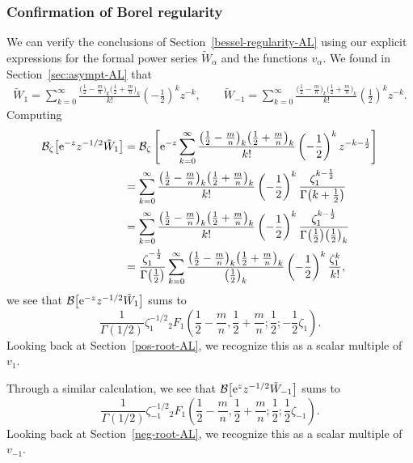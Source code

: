 \documentclass[pdftex]{sigma}
\newcommand{\borel}{\mathcal{B}}
\numberwithin{equation}{section}
\begin{document}
\subsubsection{Confirmation of Borel regularity}\label{confirmation-borel-regularity}
%
We can verify the conclusions of Section~\ref{bessel-regularity-AL} using our explicit expressions for the formal power series $\tilde{W}_\alpha$ and the functions $v_\alpha$. We found in Section~\ref{sec:asympt-AL} that
\begin{gather*}
\tilde{W}_1 = \sum_{k = 0}^{\infty} \frac{\bigl(\frac{1}{2}-\frac{m}{n}\bigr)_k \bigl(\frac{1}{2}+\frac{m}{n}\bigr)_k}{k!} \left(-\frac{1}{2}\right)^k z^{-k} ,\qquad
\tilde{W}_{-1} = \sum_{k = 0}^{\infty} \frac{\bigl(\frac{1}{2}-\frac{m}{n}\bigr)_k \bigl(\frac{1}{2}+\frac{m}{n}\bigr)_k}{k!} \left(\frac{1}{2}\right)^k z^{-k}.
\end{gather*}
Computing
\begin{align*}
\borel_\zeta \bigl[ {\rm e}^{-z} z^{-1/2} \tilde{W}_1 \bigr] & = \borel_\zeta \left[ {\rm e}^{-z} \sum_{k = 0}^{\infty} \frac{\bigl(\frac{1}{2}-\frac{m}{n}\bigr)_k \bigl(\frac{1}{2}+\frac{m}{n}\bigr)_k}{k!} \left(-\frac{1}{2}\right)^k z^{-k-\frac{1}{2}} \right] \\
& = \sum_{k = 0}^{\infty} \frac{\bigl(\frac{1}{2}-\frac{m}{n}\bigr)_k \bigl(\frac{1}{2}+\frac{m}{n}\bigr)_k}{k!} \left(-\frac{1}{2}\right)^k \frac{\zeta_1^{k-\frac{1}{2}}}{\Gamma\bigl(k+\frac{1}{2}\bigr)} \\
& = \sum_{k = 0}^{\infty} \frac{\bigl(\frac{1}{2}-\frac{m}{n}\bigr)_k \bigl(\frac{1}{2}+\frac{m}{n}\bigr)_k}{k!} \left(-\frac{1}{2}\right)^k \frac{\zeta_1^{k-\frac{1}{2}}}{\Gamma\bigl(\frac{1}{2}\bigr) \bigl(\frac{1}{2}\bigr)_k} \\
& = \frac{\zeta_1^{-\frac{1}{2}}}{\Gamma\bigl(\frac{1}{2}\bigr)} \sum_{k = 0}^{\infty} \frac{\bigl(\frac{1}{2}-\frac{m}{n}\bigr)_k \bigl(\frac{1}{2}+\frac{m}{n}\bigr)_k}{\bigl(\frac{1}{2}\bigr)_k} \left(-\frac{1}{2}\right)^k \frac{\zeta_1^k}{k!},
\end{align*}
we see that $\borel\bigl[ {\rm e}^{-z} z^{-1/2} \tilde{W}_1 \bigr]$ sums to
\[ \frac{1}{\Gamma(1/2)} \zeta_1^{-1/2} {}_2F_1\left(\frac{1}{2}-\frac{m}{n}, \frac{1}{2}+\frac{m}{n}; \frac{1}{2}; -\frac{1}{2}\zeta_1\right). \]
Looking back at Section~\ref{pos-root-AL}, we recognize this as a scalar multiple of $v_1$.

Through a similar calculation, we see that $\borel\bigl[{\rm e}^z z^{-1/2} \tilde{W}_{-1} \bigr]$ sums to
\[ \frac{1}{\Gamma(1/2)} \zeta_{-1}^{-1/2} {}_2F_1\left(\frac{1}{2}-\frac{m}{n}, \frac{1}{2}+\frac{m}{n}; \frac{1}{2}; \frac{1}{2}\zeta_{-1}\right). \]
Looking back at Section~\ref{neg-root-AL}, we recognize this as a scalar multiple of $v_{-1}$.
%
\end{document}
